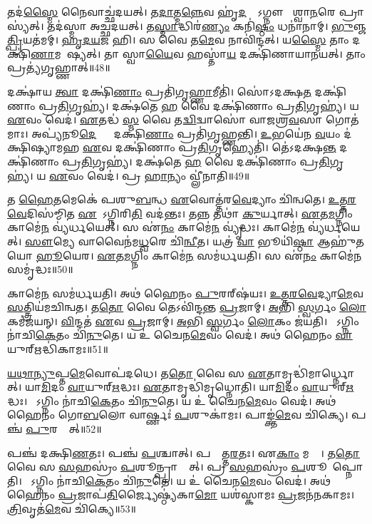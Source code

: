    𑌤𑌦॑\ul{𑌸𑍍𑌮𑍈} 𑌨𑍈𑌵𑌾𑌚𑍍𑌛॑𑌦𑌯𑌤𑍍।
   𑌤\ul{𑌦𑌾}𑌤𑍍𑌮\ul{𑌨𑍍𑌨𑍇}𑌵 𑌹𑍃॑\ul{𑌦}𑌯𑍍𑌯𑍇᳚𑌽𑌗𑍍𑌨𑍗 𑌵𑍈᳚𑌶𑍍𑌵𑌾\ul{𑌨}𑌰𑍇 𑌪𑍍𑌰𑌾𑌸𑍍𑌯॑𑌤𑍍।
   𑌤𑌦॑𑌸𑍍𑌮𑌾 𑌅𑌚𑍍𑌛𑌦𑌯𑌤𑍍।
   𑌤\ul{𑌸𑍍𑌮𑌾}𑌦𑍍𑌧𑌿𑌰॑\ul{𑌣𑍍𑌯𑌂} 𑌕𑌨𑌿॑\ul{𑌷𑍍𑌠𑌂} 𑌧𑌨𑌾॑𑌨𑌾𑌮𑍍।
   \ul{𑌭𑍁}𑌞𑍍𑌜\ul{𑌤𑍍𑌪𑍍𑌰𑌿}𑌯𑌤॑𑌮𑌮𑍍।
   \ul{𑌹𑍃}\ul{𑌦}\ul{𑌯}𑌜 𑌹𑌿।
   𑌸 𑌵𑍈 𑌤\ul{𑌮𑍇}𑌵 𑌨𑌾𑌵𑌿॑𑌨𑍍𑌦𑌤𑍍।
   𑌯\ul{𑌸𑍍𑌮𑍈} 𑌤𑌾𑌂 𑌦𑌕𑍍𑌷𑌿॑\ul{𑌣𑌾}𑌮𑌨𑍇᳚𑌷𑍍𑌯𑌤𑍍।
   𑌤𑌾 𑌸𑍍𑌵𑌾\ul{𑌯𑍈}𑌵 𑌹𑌸𑍍𑌤𑌾॑\ul{𑌯} 𑌦𑌕𑍍𑌷𑌿॑𑌣𑌾𑌯𑌾𑌨𑌯𑌤𑍍।
   𑌤𑌾𑌂 𑌪𑍍𑌰𑌤𑍍𑌯॑𑌗𑍃𑌹𑍍𑌣𑌾𑌤𑍍॥48॥

   𑌦𑌕𑍍𑌷𑌾॑𑌯 \ul{𑌤𑍍𑌵𑌾} 𑌦𑌕𑍍𑌷𑌿॑\ul{𑌣𑌾𑌂} 𑌪𑍍𑌰𑌤𑌿॑𑌗𑍃\ul{𑌹𑍍𑌣𑌾}𑌮𑍀𑌤𑌿॑।
   𑌸𑍋॑𑌽𑌦𑌕𑍍𑌷\ul{𑌤} 𑌦𑌕𑍍𑌷𑌿॑𑌣𑌾𑌂 𑌪𑍍𑌰\ul{𑌤𑌿}𑌗𑍃𑌹𑍍𑌯॑।
   𑌦𑌕𑍍𑌷॑𑌤𑍇 \ul{𑌹} 𑌵𑍈 𑌦𑌕𑍍𑌷𑌿॑𑌣𑌾𑌂 𑌪𑍍𑌰\ul{𑌤𑌿}𑌗𑍃𑌹𑍍𑌯॑।
   𑌯 \ul{𑌏}𑌵𑌂 𑌵𑍇𑌦॑।
   \ul{𑌏}𑌤𑌦𑍍𑌧॑ \ul{𑌸𑍍𑌮} 𑌵𑍈 𑌤\ul{𑌦𑍍𑌵𑌿}𑌦𑍍𑌵𑌾𑌸𑍋॑ 𑌵𑌾𑌜𑌶𑍍𑌰\ul{𑌵}𑌸𑌾 𑌗𑍋𑌤॑𑌮𑌾𑌃।
   𑌅𑌪𑍍𑌯॑𑌨𑍂\ul{𑌦𑍇}𑌶𑍍𑌯𑌾𑌂᳚ 𑌦𑌕𑍍𑌷𑌿॑\ul{𑌣𑌾𑌂} 𑌪𑍍𑌰𑌤𑌿॑𑌗𑍃𑌹𑍍𑌣𑌨𑍍𑌤𑌿।
   \ul{𑌉}𑌭𑌯𑍇॑𑌨 \ul{𑌵}𑌯𑌂 𑌦॑𑌕𑍍𑌷𑌿𑌷𑍍𑌯𑌾𑌮𑌹 \ul{𑌏}𑌵 𑌦𑌕𑍍𑌷𑌿॑𑌣𑌾𑌂 𑌪𑍍𑌰\ul{𑌤𑌿}𑌗𑍃𑌹𑍍𑌯𑍇𑌤𑌿॑।
   𑌤𑍇॑𑌽𑌦𑌕𑍍𑌷\ul{𑌨𑍍𑌤} 𑌦𑌕𑍍𑌷𑌿॑𑌣𑌾𑌂 𑌪𑍍𑌰\ul{𑌤𑌿}𑌗𑍃𑌹𑍍𑌯॑।
   𑌦𑌕𑍍𑌷॑𑌤𑍇 \ul{𑌹} 𑌵𑍈 𑌦𑌕𑍍𑌷𑌿॑𑌣𑌾𑌂 𑌪𑍍𑌰\ul{𑌤𑌿}𑌗𑍃𑌹𑍍𑌯॑।
   𑌯 \ul{𑌏}𑌵𑌂 𑌵𑍇𑌦॑।
   𑌪𑍍𑌰  \ul{𑌹𑌾}𑌨𑍍𑌯𑌂 𑌵𑍍𑌲𑍀॑𑌨𑌾𑌤𑌿॥49॥
   \anuvakamend
  
   𑌤 \ul{𑌹𑍈}𑌤𑌮𑍇𑌕𑍇॑ 𑌪𑌶𑍁\ul{𑌬}𑌨𑍍𑌧 \ul{𑌏}𑌵𑍋𑌤𑍍𑌤॑𑌰\ul{𑌵𑍇}𑌦𑍍𑌯𑌾𑌂 𑌚𑌿॑𑌨𑍍𑌵𑌤𑍇।
   \ul{𑌉}\ul{𑌤𑍍𑌤}\ul{𑌰}\ul{𑌵𑍇}𑌦𑌿𑌸॑𑌮𑍍𑌮𑌿𑌤 \ul{𑌏}𑌷𑍋᳚𑌽𑌗𑍍𑌨𑌿𑌰𑌿\ul{𑌤𑌿} 𑌵𑌦॑𑌨𑍍𑌤𑌃।
   𑌤𑌨𑍍𑌨 𑌤𑌥𑌾॑ \ul{𑌕𑍁}𑌰𑍍𑌯𑌾𑌤𑍍।
   \ul{𑌏}𑌤\ul{𑌮}𑌗𑍍𑌨𑌿𑌂 𑌕𑌾𑌮𑍇॑\ul{𑌨} 𑌵𑍍𑌯॑𑌰𑍍𑌧𑌯𑍇𑌤𑍍।
   𑌸 𑌏॑\ul{𑌨𑌂} 𑌕𑌾𑌮𑍇॑\ul{𑌨} 𑌵𑍍𑌯𑍃॑𑌦𑍍𑌧𑌃।
   𑌕𑌾𑌮𑍇॑\ul{𑌨} 𑌵𑍍𑌯॑𑌰𑍍𑌧𑌯𑍇𑌤𑍍।
   \ul{𑌸𑍗}𑌮𑍍𑌯𑍇 𑌵𑌾𑌵𑍈𑌨॑𑌮\ul{𑌧𑍍𑌵}𑌰𑍇 𑌚𑌿॑\ul{𑌨𑍍𑌵𑍀}𑌤।
   𑌯𑌤𑍍𑌰॑ \ul{𑌵𑌾} 𑌭𑍂𑌯𑌿॑\ul{𑌷𑍍𑌠𑌾} 𑌆𑌹𑍁॑𑌤𑌯𑍋 \ul{𑌹𑍂}𑌯𑍇𑌰\sn{}।
   \ul{𑌏}𑌤\ul{𑌮}𑌗𑍍𑌨𑌿𑌂 𑌕𑌾𑌮𑍇॑\ul{𑌨} 𑌸𑌮॑𑌰𑍍𑌧𑌯𑌤𑌿।
   𑌸 𑌏॑\ul{𑌨𑌂} 𑌕𑌾𑌮𑍇॑\ul{𑌨} 𑌸𑌮𑍃॑𑌦𑍍𑌧𑌃॥50॥

   𑌕𑌾𑌮𑍇॑\ul{𑌨} 𑌸𑌮॑𑌰𑍍𑌧𑌯𑌤𑌿।
   𑌅𑌥॑ 𑌹𑍈𑌨𑌂 \ul{𑌪𑍁}𑌰𑌰𑍍{‌}𑌷॑𑌯𑌃।
   \ul{𑌉}\ul{𑌤𑍍𑌤}\ul{𑌰}\ul{𑌵𑍇}𑌦𑍍𑌯𑌾\ul{𑌮𑍇}𑌵 \ul{𑌸}𑌤𑍍𑌤𑍍𑌰𑌿𑌯॑𑌮𑌚𑌿𑌨𑍍𑌵𑌤।
   𑌤\ul{𑌤𑍋} 𑌵𑍈 𑌤𑍇𑌽𑌵𑌿॑𑌨𑍍𑌦𑌨𑍍𑌤 \ul{𑌪𑍍𑌰}𑌜𑌾𑌮𑍍।
   \ul{𑌅}𑌭𑌿 \ul{𑌸𑍍𑌵}𑌰𑍍𑌗𑌂 \ul{𑌲𑍋}𑌕𑌮॑𑌜𑌯𑌨𑍍।
   \ul{𑌵𑌿}𑌨𑍍𑌦𑌤॑ \ul{𑌏}𑌵 \ul{𑌪𑍍𑌰}𑌜𑌾𑌮𑍍।
   \ul{𑌅}𑌭𑌿 \ul{𑌸𑍍𑌵}𑌰𑍍𑌗𑌂 \ul{𑌲𑍋}𑌕𑌂 𑌜॑𑌯𑌤𑌿।
   𑌯𑍋᳚𑌽𑌗𑍍𑌨𑌿𑌂 𑌨𑌾॑𑌚𑌿\ul{𑌕𑍇}𑌤𑌂 𑌚𑌿॑\ul{𑌨𑍁}𑌤𑍇।
   𑌯 𑌉॑ 𑌚𑍈𑌨\ul{𑌮𑍇}𑌵𑌂 𑌵𑍇𑌦॑।
   𑌅𑌥॑ 𑌹𑍈𑌨𑌂 \ul{𑌵𑌾}𑌯𑍁𑌰𑍍{‌}𑌋𑌦𑍍𑌧𑌿॑𑌕𑌾𑌮𑌃॥51॥

   \ul{𑌯}\ul{𑌥𑌾}\ul{𑌨𑍍𑌯𑍁}𑌪𑍍𑌤\ul{𑌮𑍇}𑌵𑍋𑌪॑𑌦𑌧𑍇।
   𑌤\ul{𑌤𑍋} 𑌵𑍈 𑌸 \ul{𑌏}𑌤𑌾𑌮𑍃𑌦𑍍𑌧𑌿॑𑌮𑌾𑌰𑍍𑌧𑍍𑌨𑍋𑌤𑍍।
   𑌯𑌾\ul{𑌮𑌿}𑌦𑌂 \ul{𑌵𑌾}𑌯𑍁𑌰𑍍{‌}\ul{𑌋}𑌦𑍍𑌧𑌃।
   \ul{𑌏}𑌤𑌾𑌮𑍃𑌦𑍍𑌧𑌿॑𑌮𑍃𑌧𑍍𑌨𑍋𑌤𑌿।
   𑌯𑌾\ul{𑌮𑌿}𑌦𑌂 \ul{𑌵𑌾}𑌯𑍁𑌰𑍍{‌}\ul{𑌋}𑌦𑍍𑌧𑌃।
   𑌯𑍋᳚𑌽𑌗𑍍𑌨𑌿𑌂 𑌨𑌾॑𑌚𑌿\ul{𑌕𑍇}𑌤𑌂 𑌚𑌿॑\ul{𑌨𑍁}𑌤𑍇।
   𑌯 𑌉॑ 𑌚𑍈𑌨\ul{𑌮𑍇}𑌵𑌂 𑌵𑍇𑌦॑।
   𑌅𑌥॑ 𑌹𑍈𑌨𑌂 𑌗𑍋\ul{𑌬}𑌲𑍋 𑌵𑌾𑌰𑍍𑌷𑍍𑌣𑌃॑ \ul{𑌪}𑌶𑍁𑌕𑌾॑𑌮𑌃।
   𑌪𑌾𑌙𑍍𑌕𑍍𑌤॑\ul{𑌮𑍇}𑌵 𑌚𑌿॑𑌕𑍍𑌯𑍇।
   𑌪𑌞𑍍𑌚॑ \ul{𑌪𑍁}𑌰𑌸𑍍𑌤𑌾᳚𑌤𑍍॥52॥

   𑌪𑌞𑍍𑌚॑ 𑌦𑌕𑍍𑌷𑌿\ul{𑌣}𑌤𑌃।
   𑌪𑌞𑍍𑌚॑ \ul{𑌪}𑌶𑍍𑌚𑌾𑌤𑍍।
   𑌪𑌞𑍍𑌚𑍋᳚𑌤𑍍𑌤\ul{𑌰}𑌤𑌃।
   𑌏\ul{𑌕𑌾𑌂} 𑌮𑌧𑍍𑌯𑍇᳚।
   𑌤\ul{𑌤𑍋} 𑌵𑍈 𑌸 \ul{𑌸}𑌹𑌸𑍍𑌰𑌂॑ \ul{𑌪}𑌶𑍂𑌨𑍍𑌪𑍍𑌰𑌾𑌪𑍍𑌨𑍋᳚𑌤𑍍।
   𑌪𑍍𑌰 \ul{𑌸}𑌹𑌸𑍍𑌰𑌂॑ \ul{𑌪}𑌶𑍂𑌨𑌾᳚𑌪𑍍𑌨𑍋𑌤𑌿।
   𑌯𑍋᳚𑌽𑌗𑍍𑌨𑌿𑌂 𑌨𑌾॑𑌚𑌿\ul{𑌕𑍇}𑌤𑌂 𑌚𑌿॑\ul{𑌨𑍁}𑌤𑍇।
   𑌯 𑌉॑ 𑌚𑍈𑌨\ul{𑌮𑍇}𑌵𑌂 𑌵𑍇𑌦॑।
   𑌅𑌥॑ 𑌹𑍈𑌨𑌂 \ul{𑌪𑍍𑌰}𑌜𑌾𑌪॑\ul{𑌤𑌿}𑌰𑍍𑌜𑍍𑌯𑍈𑌷𑍍𑌠𑍍𑌯॑𑌕𑌾\ul{𑌮𑍋} 𑌯𑌶॑𑌸𑍍𑌕𑌾𑌮𑌃 \ul{𑌪𑍍𑌰}𑌜𑌨॑𑌨𑌕𑌾𑌮𑌃।
   \ul{𑌤𑍍𑌰𑌿}𑌵𑍃𑌤॑\ul{𑌮𑍇}𑌵 𑌚𑌿॑𑌕𑍍𑌯𑍇॥53॥

